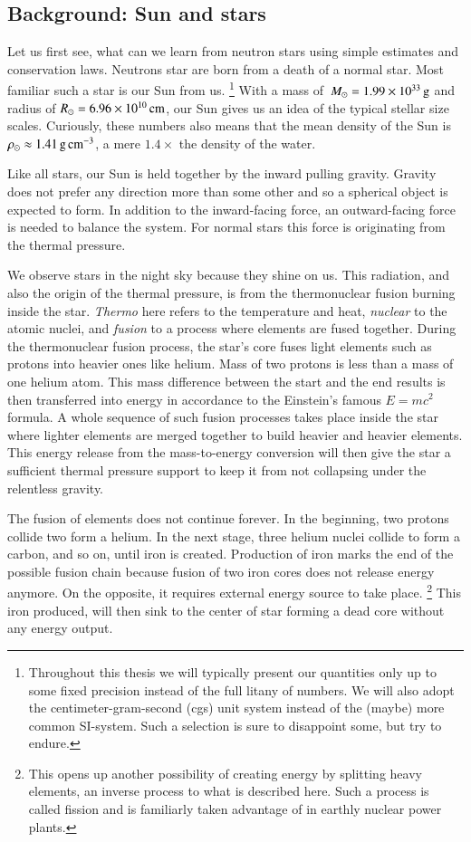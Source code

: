 \subsection{Background: Sun and stars}
Let us first see, what can we learn from neutron stars using simple estimates and conservation laws.
Neutrons star are born from a death of a normal star.%
Most familiar such a star is our Sun  \cm from us.%
\footnote{Throughout this thesis we will typically present our quantities only up to some fixed precision instead of the full litany of numbers.
We will also adopt the centimeter-gram-second (cgs) unit system instead of the (maybe) more common SI-system. 
Such a selection is sure to disappoint some, but try to endure.
}
With a mass of $\, M_{\odot} = 1.99 \times 10^{33} \, \mathrm{g}$ and radius of $R_{\odot} = 6.96 \times 10^{10} \, \mathrm{cm}$, our Sun gives us an idea of the typical stellar size scales.
Curiously, these numbers also means that the mean density of the Sun is $\rho_{\odot} \approx 1.41 \, \mathrm{g}\,\mathrm{cm}^{-3} $, a mere $1.4\times$ the density of the water.

Like all stars, our Sun is held together by the inward pulling gravity.
Gravity does not prefer any direction more than some other and so a spherical object is expected to form.
In addition to the inward-facing force, an outward-facing force is needed to balance the system.
For normal stars this force is originating from the thermal pressure.

We observe stars in the night sky because they shine on us.
This radiation, and also the origin of the thermal pressure, is from the thermonuclear fusion burning inside the star.
\textit{Thermo} here refers to the temperature and heat, \textit{nuclear} to the atomic nuclei, and \textit{fusion} to a process where elements are fused together.
During the thermonuclear fusion process, the star's core fuses light elements such as protons into heavier ones like helium.
Mass of two protons is less than a mass of one helium atom.
This mass difference between the start and the end results is then transferred into energy in accordance to the Einstein's famous $E = mc^2$ formula.
A whole sequence of such fusion processes takes place inside the star where lighter elements are merged together to build heavier and heavier elements.
This energy release from the mass-to-energy conversion will then give the star a sufficient thermal pressure support to keep it from not collapsing under the relentless gravity.

The fusion of elements does not continue forever.
In the beginning, two protons collide two form a helium.
In the next stage, three helium nuclei collide to form a carbon, and so on, until iron is created.
Production of iron marks the end of the possible fusion chain because fusion of two iron cores does not release energy anymore. 
On the opposite, it requires external energy source to take place.%
\footnote{This opens up another possibility of creating energy by splitting heavy elements, an inverse process to what is described here. Such a process is called fission and is familiarly taken advantage of in earthly nuclear power plants.}
This iron produced, will then sink to the center of star forming a dead core without any energy output.

